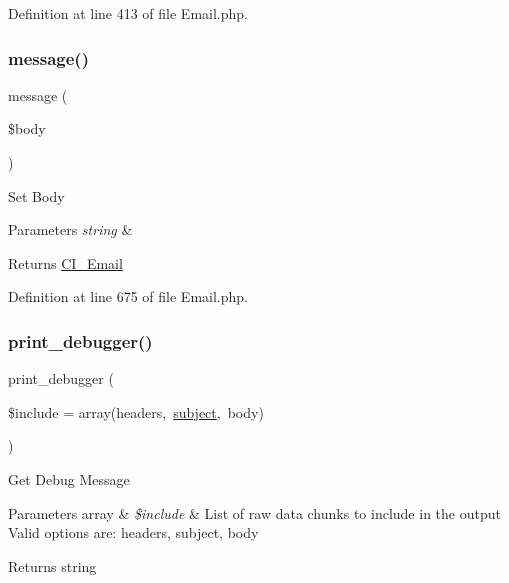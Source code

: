 Definition at line 413 of file Email.\+php.

\mbox{\label{class_c_i___email_a62559aacd297073072c30009daa8de86}} 
\subsubsection{\texorpdfstring{message()}{message()}}
{\footnotesize\ttfamily message (\begin{DoxyParamCaption}\item[{}]{\$body }\end{DoxyParamCaption})}

Set Body


\begin{DoxyParams}{Parameters}
{\em string} & \\
\hline
\end{DoxyParams}
\begin{DoxyReturn}{Returns}
\mbox{\hyperlink{class_c_i___email}{C\+I\+\_\+\+Email}} 
\end{DoxyReturn}


Definition at line 675 of file Email.\+php.

\mbox{\label{class_c_i___email_a11f22e40cb1409ee7569c0abc15fae09}} 
\subsubsection{\texorpdfstring{print\_debugger()}{print\_debugger()}}
{\footnotesize\ttfamily print\+\_\+debugger (\begin{DoxyParamCaption}\item[{}]{\$include = {\ttfamily array(\textquotesingle{}headers\textquotesingle{},~\textquotesingle{}\mbox{\hyperlink{class_c_i___email_aaa61b3aaa6cc4c90e26686e4bf41587a}{subject}}\textquotesingle{},~\textquotesingle{}body\textquotesingle{})} }\end{DoxyParamCaption})}

Get Debug Message


\begin{DoxyParams}[1]{Parameters}
array & {\em \$include} & List of raw data chunks to include in the output Valid options are\+: \textquotesingle{}headers\textquotesingle{}, \textquotesingle{}subject\textquotesingle{}, \textquotesingle{}body\textquotesingle{} \\
\hline
\end{DoxyParams}
\begin{DoxyReturn}{Returns}
string 
\end{DoxyReturn}


